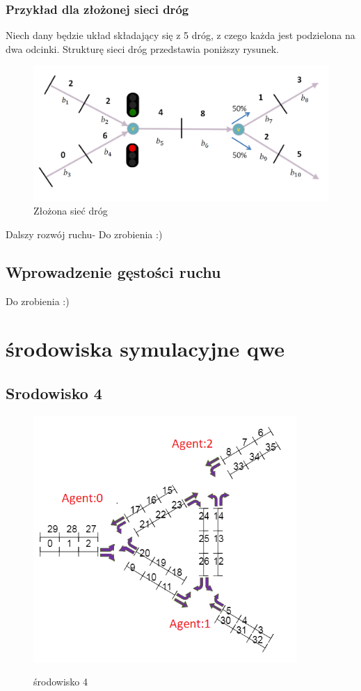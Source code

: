 \documentclass[12pt]{book}
\theoremstyle{plain}
\begin{document}
\subsection{Przykład dla złożonej sieci dróg}
Niech dany będzie układ składający się z 5 dróg, z czego każda jest podzielona na dwa odcinki. Strukturę sieci dróg przedstawia poniższy rysunek.
\begin{figure}[H]
	\centering
	\includegraphics[width=14cm]{5_drog}
	\caption{Złożona sieć dróg}
	\label{fig:5_drog}
\end{figure}
Dalszy rozwój ruchu-
Do zrobienia :)
\section{Wprowadzenie gęstości ruchu}
Do zrobienia :)












\chapter {środowiska symulacyjne qwe}
\section{Srodowisko 4}
\begin{figure}[H]
	\centering
	\includegraphics[width=10cm]{env_4_agenci}
	\label{fig:env_4_agenci}
	\caption{środowisko 4}
\end{figure}
\end{document}
